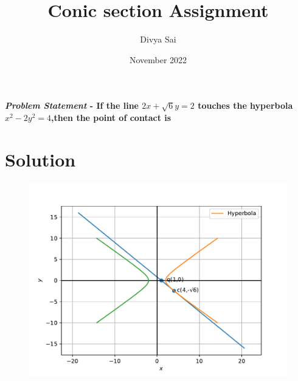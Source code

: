 \documentclass[journal,10pt,twocolumn]{article}
\title{\textbf{Conic section Assignment}}
\author{Divya Sai }
\date{November 2022}
\begin{document}
\maketitle
\paragraph{\textit{Problem Statement} - If the line  $2x+\sqrt{6}y=2$ touches the hyperbola $x^2-2y^2=4$,then the point of contact is}

\section*{\large Solution}

\begin{figure}[h]
\centering
\includegraphics[width=1\columnwidth]{conics11.pdf}

\caption{}
\label{fig:parabola}
\end{figure}
\end{document}
